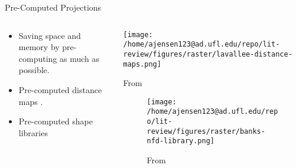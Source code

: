 \documentclass[presentation, aspectratio=1610]{beamer}
\begin{document}
\begin{frame}[label={sec:org8fac610}]{Pre-Computed Projections}
\begin{columns}
\begin{column}{0.5\columnwidth}
\begin{itemize}
\item Saving space and memory by pre-computing as much as possible.
\item Pre-computed distance maps \autocites{zuffiModelbasedMethodReconstruction1999}[][]{lavalleeRecoveringPositionOrientation1995}.
\item Pre-computed shape libraries \autocite{banksAccurateMeasurementThreedimensional1996}
\end{itemize}
\end{column}
\begin{column}{0.6\columnwidth}
\begin{center}
\texttt{[image: /home/ajensen123@ad.ufl.edu/repo/lit-review/figures/raster/lavallee-distance-maps.png]}
\caption{From \autocite{lavalleeRecoveringPositionOrientation1995}}
\end{center}
\vspace{-0.25in}
\begin{figure}[htbp]
\centering
\texttt{[image: /home/ajensen123@ad.ufl.edu/repo/lit-review/figures/raster/banks-nfd-library.png]}
\caption{From \autocite{banksAccurateMeasurementThreedimensional1996}}
\end{figure}
\end{column}
\end{columns}
\end{frame}
\end{document}

